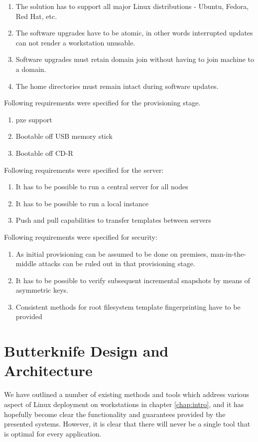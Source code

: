 \documentclass[a4paper,11pt]{kth-mag}
\begin{document}
\begin{enumerate}
\item The solution has to support all major Linux distributions - Ubuntu, Fedora, Red Hat, etc.
\item The software upgrades have to be atomic, in other words interrupted updates can not render a workstation unusable. 
\item Software upgrades must retain domain join without having to join machine to a domain.
\item The home directories must remain intact during software updates.
\end{enumerate}

\noindent Following requirements were specified for the provisioning stage.

\begin{enumerate}
\item \gls{pxe} support
\item Bootable off USB memory stick
\item Bootable off CD-R
\end{enumerate}

\noindent Following requirements were specified for the server:

\begin{enumerate}
\item It has to be possible to run a central server for all nodes
\item It has to be possible to run a local instance
\item Push and pull capabilities to transfer templates between servers
\end{enumerate}

\noindent Following requirements were specified for security:

\begin{enumerate}
\item As initial provisioning can be assumed to be done on premises,
man-in-the-middle attacks can be ruled out in that
provisioning stage.
\item It has to be possible to verify subsequent incremental snapshots by means of asymmetric keys.
\item Consistent methods for root filesystem template fingerprinting have to be provided
\end{enumerate}


%
%
%
%
\chapter{Butterknife Design and Architecture}
\label{chap:design}
We have outlined a number of existing methods and tools 
which address various aspect of Linux deployment on workstations
in chapter \ref{chap:intro}, and it has hopefully become clear
the functionality and guarantees provided by the presented systems.
However, it is clear that there will never be a single tool
that is optimal for every application. 
\end{document}
